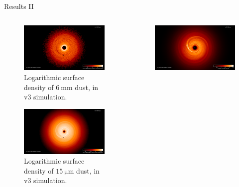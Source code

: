 \documentclass[9pt]{beamer}
\begin{document}
\begin{frame}{Results II}
    \begin{columns}
        \begin{column}{0.5\textwidth}
            \begin{figure}
                \includegraphics[width=0.8\hsize]{dust1-165v3}
                \caption{
                    Logarithmic surface density of $\SI{6}{\milli\meter}$ dust,
                    in v3 simulation.
                }
            \end{figure}
            \begin{figure}
                \includegraphics[width=0.8\hsize]{dust2-165v3}
                \caption{
                    Logarithmic surface density of $\SI{15}{\micro\meter}$ dust,
                    in v3 simulation.
                }
            \end{figure}
        \end{column}
        \begin{column}{0.5\textwidth}
            \begin{figure}
                \includegraphics[width=0.8\hsize]{gas-305}

\end{figure}
\end{column}
\end{columns}
\end{frame}
\end{document}

